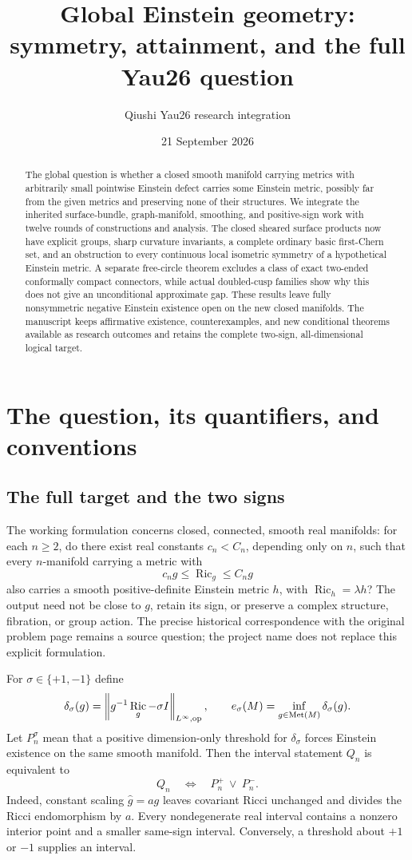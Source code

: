 \documentclass[11pt]{article}
\title{Global Einstein geometry:\\symmetry, attainment, and the full Yau26 question}
\author{Qiushi Yau26 research integration}
\date{21 September 2026}
\DeclareMathOperator{\Ric}{Ric}\DeclareMathOperator{\Rm}{Rm}
\DeclareMathOperator{\Met}{Met}\DeclareMathOperator{\Diff}{Diff}
\newcommand{\norm}[1]{\left\|#1\right\|}
\theoremstyle{definition}\newtheorem{problem}[theorem]{Open problem}
\theoremstyle{remark}\newtheorem{remark}[theorem]{Scope}
\numberwithin{equation}{section}
\begin{document}
\maketitle
\begin{abstract}
The global question is whether a closed smooth manifold carrying metrics with arbitrarily small pointwise Einstein defect carries some Einstein metric, possibly far from the given metrics and preserving none of their structures. We integrate the inherited surface-bundle, graph-manifold, smoothing, and positive-sign work with twelve rounds of constructions and analysis. The closed sheared surface products now have explicit groups, sharp curvature invariants, a complete ordinary basic first-Chern set, and an obstruction to every continuous local isometric symmetry of a hypothetical Einstein metric. A separate free-circle theorem excludes a class of exact two-ended conformally compact connectors, while actual doubled-cusp families show why this does not give an unconditional approximate gap. These results leave fully nonsymmetric negative Einstein existence open on the new closed manifolds. The manuscript keeps affirmative existence, counterexamples, and new conditional theorems available as research outcomes and retains the complete two-sign, all-dimensional logical target.
\end{abstract}
\tableofcontents

\section{The question, its quantifiers, and conventions}\label{sec:question}
\subsection{The full target and the two signs}\label{sec:quantifiers}
The working formulation concerns closed, connected, smooth real manifolds: for each $n\ge2$, do there exist real constants $c_n<C_n$, depending only on $n$, such that every $n$-manifold carrying a metric with
\[
 c_ng\le\Ric_g\le C_ng
\]
also carries a smooth positive-definite Einstein metric $h$, with $\Ric_h=\lambda h$? The output need not be close to $g$, retain its sign, or preserve a complex structure, fibration, or group action. The precise historical correspondence with the original problem page remains a source question; the project name does not replace this explicit formulation.

For $\sigma\in\{+1,-1\}$ define
\[
 \delta_\sigma(g)=\norm{g^{-1}\Ric_g-\sigma I}_{L^\infty,\op},\qquad
 e_\sigma(M)=\inf_{g\in\Met(M)}\delta_\sigma(g).
\]
Let $P_n^\sigma$ mean that a positive dimension-only threshold for $\delta_\sigma$ forces Einstein existence on the same smooth manifold. Then the interval statement $Q_n$ is equivalent to
\begin{equation}\label{eq:two-signs}
 Q_n\quad\Longleftrightarrow\quad P_n^+\ \lor\ P_n^-.
\end{equation}
Indeed, constant scaling $\widehat g=ag$ leaves covariant Ricci unchanged and divides the Ricci endomorphism by $a$. Every nondegenerate real interval contains a nonzero interior point and a smaller same-sign interval. Conversely, a threshold about $+1$ or $-1$ supplies an interval.
\end{document}
